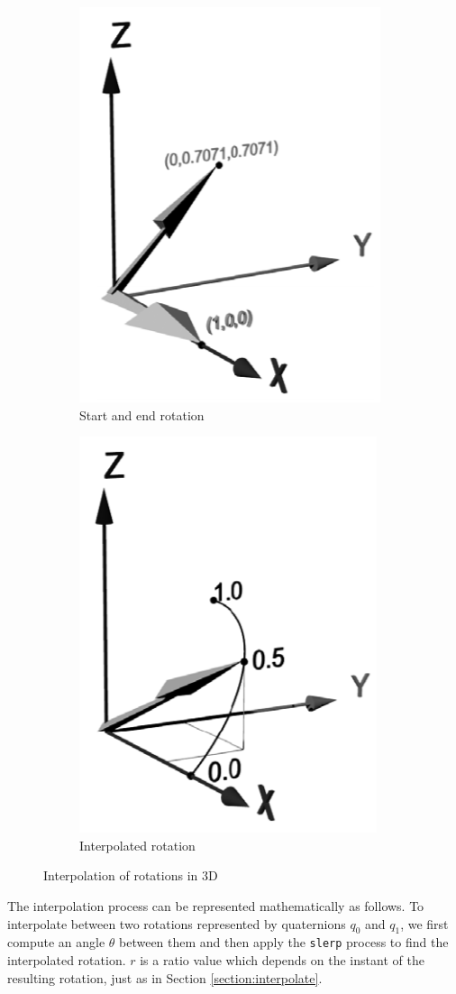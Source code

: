 \begin{figure}[h!]
\centering
\begin{subfigure}{.5\textwidth}
  \centering
  \includegraphics[width=.4\linewidth]{images/3d_start_end_rotations.png}
  \caption{Start and end rotation}
\end{subfigure}%
\begin{subfigure}{.5\textwidth}
  \centering
  \includegraphics[width=.4\linewidth]{images/3d_interpolated_rotation.png}
  \caption{Interpolated rotation}
\end{subfigure}
\caption[Interpolation of rotations in 3D]{Interpolation of rotations in 3D \cite{ISO19141_moving_features}}
\label{fig:3d_interpolation}
\end{figure}

The interpolation process can be represented mathematically as follows. To interpolate between two rotations represented by quaternions \( q_0 \) and \( q_1 \), we first compute an angle \( \theta \) between them and then apply the \lstinline{slerp} process to find the interpolated rotation. $r$ is a ratio value which depends on the instant of the resulting rotation, just as in Section \ref{section:interpolate}.


